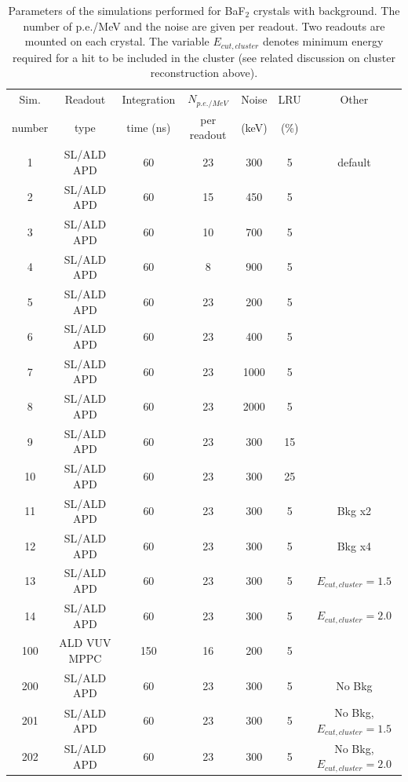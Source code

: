 \begin{table}[htb]
\begin{center}
\begin{tabular}{|c|c|c|c|c|c|c|}\hline
Sim.   & Readout      & Integration & $N_{p.e./ MeV}$ & Noise & LRU & Other \\ 
number & type         & time (ns)   &   per readout   & (keV) & (\%)& \\\hline
1      & SL/ALD APD   &  60         & 23              & 300   &  5  & default \\
2      & SL/ALD APD   &  60         & 15              & 450   &  5  & \\
3      & SL/ALD APD   &  60         & 10              & 700   &  5  & \\
4      & SL/ALD APD   &  60         &  8              & 900   &  5  & \\
5      & SL/ALD APD   &  60         & 23              & 200   &  5  & \\
6      & SL/ALD APD   &  60         & 23              & 400   &  5  & \\
7      & SL/ALD APD   &  60         & 23              &1000   &  5  & \\
8      & SL/ALD APD   &  60         & 23              &2000   &  5  & \\
9      & SL/ALD APD   &  60         & 23              & 300   & 15  & \\
10     & SL/ALD APD   &  60         & 23              & 300   & 25  & \\
11     & SL/ALD APD   &  60         & 23              & 300   &  5  & Bkg x2 \\
12     & SL/ALD APD   &  60         & 23              & 300   &  5  & Bkg x4 \\
13     & SL/ALD APD   &  60         & 23              & 300   &  5  & $E_{cut,cluster} = 1.5$  \\
14     & SL/ALD APD   &  60         & 23              & 300   &  5  & $E_{cut,cluster} = 2.0$  \\
100    & ALD VUV MPPC & 150         & 16              & 200   &  5  &        \\ \hline
200    & SL/ALD APD   &  60         & 23              & 300   &  5  & No Bkg \\ 
201    & SL/ALD APD   &  60         & 23              & 300   &  5  & No Bkg, $E_{cut,cluster} = 1.5$ \\ 
202    & SL/ALD APD   &  60         & 23              & 300   &  5  & No Bkg, $E_{cut,cluster} = 2.0$ \\ \hline
\end{tabular}
\end{center}
\caption{Parameters of the simulations performed for BaF$_2$ crystals with background. The number of 
p.e./MeV and the noise are given per readout. Two readouts are mounted on each crystal. The variable 
$E_{cut,cluster}$ denotes minimum energy required for a hit to be included in the cluster (see related 
discussion on cluster reconstruction above).}
\label{sim:tab::BaF2}
\end{table}   

